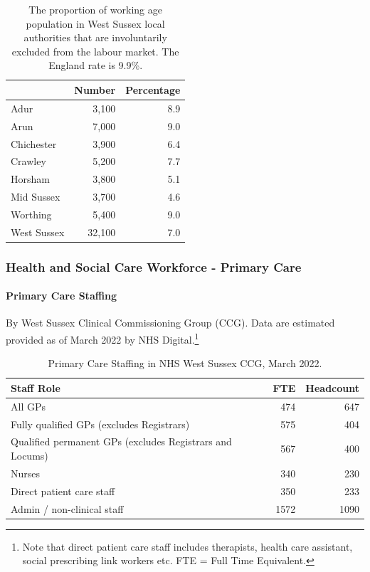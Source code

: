 \begin{table}[hbt]
    \caption{The proportion of working age population in West Sussex local authorities that are involuntarily excluded from the labour market. The England rate is 9.9\%.}
    \centering
    \begin{tabular}{lrr}
    \toprule
    \ & Number & Percentage \\
    \midrule
    Adur & 3,100 & 8.9 \\
    Arun & 7,000 & 9.0 \\
    Chichester & 3,900 & 6.4\\
    Crawley & 5,200 & 7.7\\
    Horsham & 3,800 & 5.1\\
    Mid Sussex & 3,700 & 4.6\\
    Worthing & 5,400 & 9.0\\
    West Sussex & 32,100 & 7.0\\
    \bottomrule
    \end{tabular}
    \label{tab:wa:empdep}
\end{table}

\subsubsection{Health and Social Care Workforce - Primary Care}
\paragraph{Primary Care Staffing} By West Sussex Clinical Commissioning Group (CCG). Data are estimated provided as of March 2022 by NHS Digital.\footnote{Note that direct patient care staff includes therapists, health care assistant, social prescribing link workers etc. FTE = Full Time Equivalent.}
\begin{table}[hbt]
    \caption[Primary Care Staffing in NHS West Sussex CCG, March 2022.]{Primary Care Staffing in NHS West Sussex CCG, March 2022.}
    \centering
    \begin{tabular}{lrr}
    \toprule
    Staff Role & FTE & Headcount \\
    \midrule
    All GPs  & 474 & 647  \\
    Fully qualified GPs \scriptsize{(excludes Registrars)} & 575 & 404 \\
    Qualified permanent GPs \scriptsize{(excludes Registrars and Locums)} & 567 & 400 \\
    Nurses & 340 & 230 \\
    Direct patient care staff & 350 & 233 \\
    Admin / non-clinical staff & 1572 & 1090 \\
    \bottomrule
    \end{tabular}
    \label{tab:wa:primarystaff}
\end{table}

